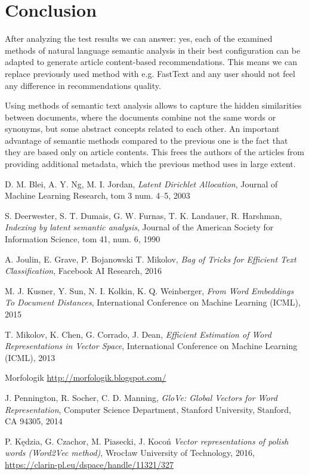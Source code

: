 \documentclass[twoside,twocolumn]{article}
\begin{document}
	\section{Conclusion}
	
	After analyzing the test results we can answer: yes, each of the examined methods of natural language semantic analysis in their best configuration can be adapted to generate article content-based recommendations. This means we can replace previously used method with e.g. FastText and any user should not feel any difference in recommendations quality.
	
	Using methods of semantic text analysis allows to capture the hidden similarities between documents, where the documents combine not the same words or synonyms, but some abstract concepts related to each other. An important advantage of semantic methods compared to the previous one is the fact that they are based only on article contents. This frees the authors of the articles from providing additional metadata, which the previous method uses in large extent.
	
	
	\begin{thebibliography}{99}
		D. M. Blei, A. Y. Ng, M. I. Jordan,
		\emph{Latent Dirichlet Allocation},
		Journal of Machine Learning Research, tom 3 num. 4–5,
		2003
		
		S. Deerwester, S. T. Dumais, G. W. Furnas, T. K. Landauer, R. Harshman,
		\emph{Indexing by latent semantic analysis},
		Journal of the American Society for Information Science, tom 41, num. 6,
		1990
		
		A. Joulin, E. Grave, P. Bojanowski T. Mikolov,
		\emph{Bag of Tricks for Efficient Text Classification},
		Facebook AI Research,
		2016
		
		M. J. Kusner, Y. Sun, N. I. Kolkin, K. Q. Weinberger,
		\emph{From Word Embeddings To Document Distances},
		International Conference on Machine Learning (ICML),
		2015
		
		T. Mikolov, K. Chen, G. Corrado, J. Dean,
		\emph{Efficient Estimation of Word Representations in Vector Space},
		International Conference on Machine Learning (ICML),
		2013
		
		Morfologik
		\url{http://morfologik.blogspot.com/}
		
		J. Pennington, R. Socher, C. D. Manning,
		\emph{GloVe: Global Vectors for Word Representation},
		Computer Science Department, Stanford University, Stanford, CA 94305,
		2014

		P. Kędzia, G. Czachor, M. Piasecki, J. Kocoń
		\emph{Vector representations of polish words (Word2Vec method)},
		Wrocław University of Technology,
		2016,
		\url{https://clarin-pl.eu/dspace/handle/11321/327}
	\end{thebibliography}
	
	
\end{document}
